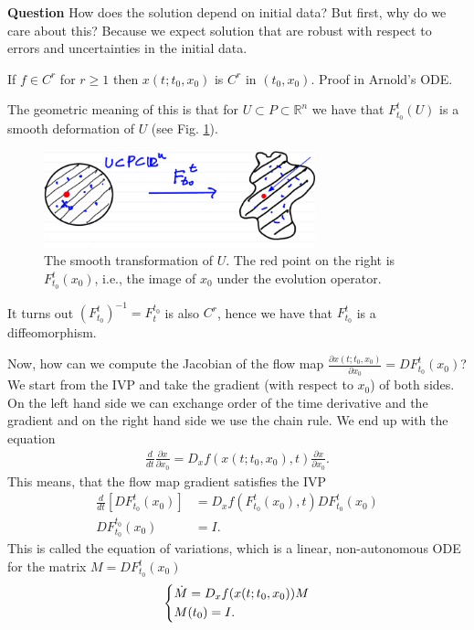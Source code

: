 \textbf{Question} How does the solution depend on initial data?
But first, why do we care about this? Because we expect solution that are robust with respect to errors and uncertainties in the initial data.
\begin{theorem}[]
	If $f \in C^r$ for $r\geq 1$ then $x(t; t_0, x_0)$ is $C^r$ in $(t_0, x_0)$. Proof in Arnold's ODE.
\end{theorem}

The geometric meaning of this is that for $U \subset P \subset \mathbb{R}^{n}$ we have that $F_{t_0}^{t}(U)$ is a smooth deformation of $U$ (see Fig. \ref{fig:chap1:7}).
\begin{figure}[h]
	\centering
	\includegraphics[width=0.7\textwidth]{figures/ch1/7smooth_transform.png}
	\caption{The smooth transformation of $U$. The red point on the right is $F _{t_0}^t(x_0)$, i.e., the image of $x_0$ under the evolution operator.}
	\label{fig:chap1:7}
\end{figure}
It turns out $\left(F_{t_0}^{t}\right)^{-1} = F_{t}^{t_0}$ is also $C^r$, hence we have that $F_{t_0}^{t}$ is a diffeomorphism. 

Now, how can we compute the Jacobian of the flow map $\frac{\partial x(t; t_0, x_0)}{ \partial x_0} = DF _{t_0}^{t}(x_0)$? We start from the IVP and take the gradient (with respect to $x_0$) of both sides. On the left hand side we can exchange order of the time derivative and the gradient and on the right hand side we use the chain rule. We end up with the equation
\begin{align}
	\frac{d}{dt}\frac{\partial x}{\partial x_0} = D_x f(x(t; t_0, x_0), t) \frac{\partial x}{\partial x_0}.
\end{align}
This means, that the flow map gradient satisfies the IVP
\begin{align}
	\frac{d}{dt}\left[ DF_{t_0}^{t}(x_0)\right] &= D_{x}f(F_{t_0}^{t}(x_0), t) DF_{t_0}^{t}(x_0) \\
	DF_{t_0}^{t_0}(x_0) &= I.
\end{align}
This is called the equation of variations, which is a linear, non-autonomous ODE for the matrix $M = DF _{t_0}^{t}(x_0)$
\begin{align}
	\begin{dcases}
		\dot{M} = D_x f(x(t; t_0, x_0)) M \\ M(t_0) = I.
	\end{dcases}
\end{align}
